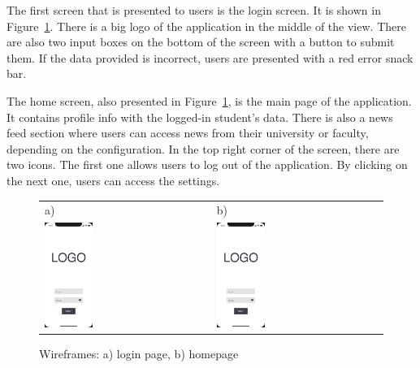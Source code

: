 The first screen that is presented to users is the login screen. It is shown in Figure~\ref{fig:login-home}. There is a big logo of the application in the middle of the view. There are also two input boxes on the bottom of the screen with a button to submit them. If the data provided is incorrect, users are presented with a red error snack bar.

The home screen, also presented in Figure~\ref{fig:login-home}, is the main page of the application. It contains profile info with the logged-in student's data. There is also a news feed section where users can access news from their university or faculty, depending on the configuration. In the top right corner of the screen, there are two icons. The first one allows users to log out of the application. By clicking on the next one, users can access the settings.

\begin{figure}[htb]
    \centering
    \begin{tabular}{@{}ll@{}}
        a) & b) \\
        \includegraphics[page=1,width=0.300\textwidth]{fig04/jsos_helper_wireframe.pdf} &
        \includegraphics[page=7,width=0.300\textwidth]{fig04/jsos_helper_wireframe.pdf} \\
    \end{tabular}
    \caption{Wireframes: a) login page, b) homepage} \label{fig:login-home}
\end{figure}

